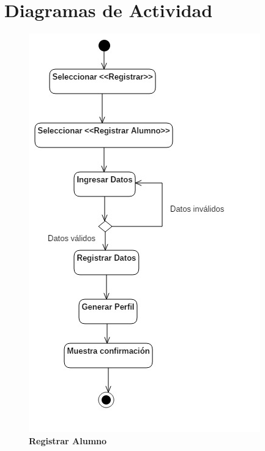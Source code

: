 \chapter{Diagramas de Actividad}
\begin{figure}[H]
  \centering
    \includegraphics[scale=.8,angle=0]{project/Actividades/Alumno.jpg}
  \caption{\textbf{Registrar Alumno}}
\end{figure}
